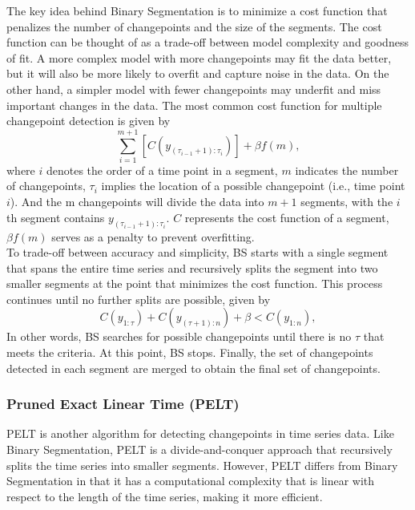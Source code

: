 \documentclass[]{interact}
\theoremstyle{plain}%
\theoremstyle{definition}
\theoremstyle{remark}
\begin{document}
{	The key idea behind Binary Segmentation is to minimize a cost function that penalizes the number of changepoints and the size of the segments. The cost function can be thought of as a trade-off between model complexity and goodness of fit. A more complex model with more changepoints may fit the data better, but it will also be more likely to overfit and capture noise in the data. On the other hand, a simpler model with fewer changepoints may underfit and miss important changes in the data. The most common cost function for multiple changepoint detection is given by
	\begin{equation} \label{4}
		\sum_{i = 1} ^{m + 1} \left[C(y_{({\tau_{i-1} + 1}):\tau_{i}}) \right] + \beta f(m),
	\end{equation}
	where $i$ denotes the order of a time point in a segment, $m$ indicates the number of changepoints, $\tau_i$ implies the location of a possible changepoint (i.e., time point $i$). And the m changepoints will divide the data into $m+1$ segments, with the $i$th segment contains $y_{({\tau_{i-1} + 1}):\tau_{i}}$. $C$ represents the cost function of a segment, $\beta f(m)$ serves as a penalty to prevent overfitting\cite{killickOptimalDetectionChangepoints2012}. \\
	
	To trade-off between accuracy and simplicity, BS starts with a single segment that spans the entire time series and recursively splits the segment into two smaller segments at the point that minimizes the cost function. This process continues until no further splits are possible, given by
	\begin{equation} \label{5}
		C(y_{1:\tau}) + C(y_{({\tau + 1}):n}) + \beta < C(y_{1:n}),
	\end{equation}
	In other words, BS searches for possible changepoints until there is no $\tau$ that meets the criteria. At this point, BS stops. Finally, the set of changepoints detected in each segment are merged to obtain the final set of changepoints.
	
	\subsubsection{Pruned Exact Linear Time (PELT)} \label{sec:PELT}
	
	
	\hspace{0.23cm} PELT is another algorithm for detecting changepoints in time series data. Like Binary Segmentation, PELT is a divide-and-conquer approach that recursively splits the time series into smaller segments. However, PELT differs from Binary Segmentation in that it has a computational complexity that is linear with respect to the length of the time series\cite{killickOptimalDetectionChangepoints2012}, making it more efficient. \\
	
}
\end{document}
